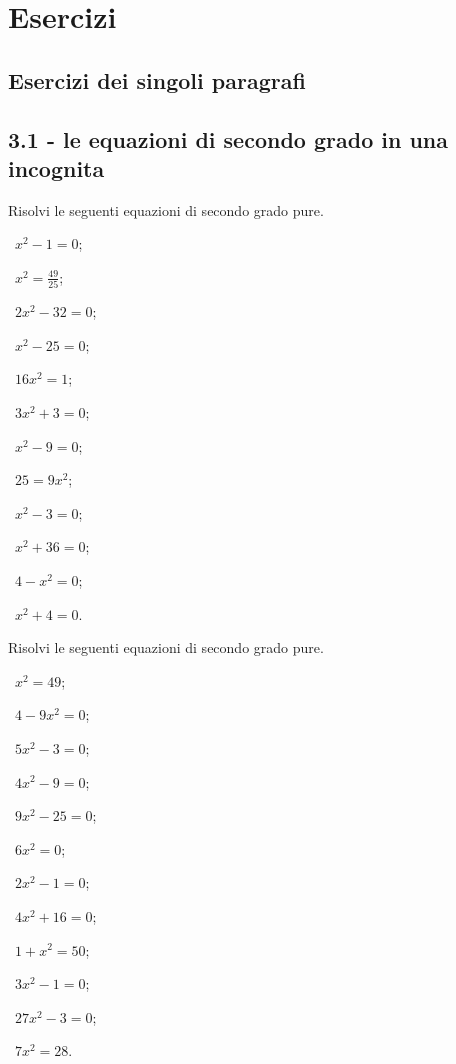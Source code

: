 \section{Esercizi}
\subsection{Esercizi dei singoli paragrafi}
\subsection*{3.1 - le equazioni di secondo grado in una incognita}

\begin{esercizio}[\Ast]
 \label{ese:3.1}
Risolvi le seguenti equazioni di secondo grado pure.
\begin{multicols}{3}
 \begin{enumeratea}
 \item~$x^{2}-1 = 0$;
 \item~$x^{2}=\frac{49}{25}$;
 \item~$2x^{2} - 32 = 0$;
 \item~$x^{2}-25=0$;
 \item~$16 x^{2}=1$;
 \item~$3x^{2}+3=0$;
 \item~$x^{2}-9=0$;
 \item~$25=9 x^{2}$;
 \item~$x^{2} - 3 = 0$;
 \item~$x^{2} + 36 = 0$;
 \item~$4 - x^{2} = 0$;
 \item~$x^{2} + 4 = 0$.
 \end{enumeratea}
 \end{multicols}
\end{esercizio}

\begin{esercizio}[\Ast]
\label{ese:3.2}
Risolvi le seguenti equazioni di secondo grado pure.
\begin{multicols}{3}
 \begin{enumeratea}
 \item~$x^{2} = 49$;
 \item~$4 - 9 x^{2} = 0$;
 \item~$5 x^{2} - 3 = 0$;
 \item~$4 x^{2} - 9 = 0$;
 \item~$9 x^{2} - 25 = 0$;
 \item~$6 x^{2} = 0$;
 \item~$2 x^{2} - 1 = 0$;
 \item~$4 x^{2} + 16 = 0$;
 \item~$1 + x^{2} = 50$;
 \item~$3 x^{2} - 1 = 0$;
 \item~$27 x^{2} - 3 = 0$;
 \item~$7 x^{2} = 28$.
 \end{enumeratea}
 \end{multicols}
\end{esercizio}

